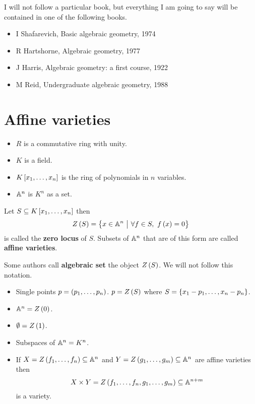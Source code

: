 I will not follow a particular book, but everything I am going to say will be contained in one of the following books.
\begin{itemize}
\item I Shafarevich, Basic algebraic geometry, 1974
\item R Hartshorne, Algebraic geometry, 1977
\item J Harris, Algebraic geometry: a first course, 1922
\item M Reid, Undergraduate algebraic geometry, 1988
\end{itemize}

\pagebreak

\section{Affine varieties}

\begin{notation}
\hfill
\begin{itemize}
\item $ R $ is a commutative ring with unity.
\item $ K $ is a field.
\item $ K\sbr{x_1, \dots, x_n} $ is the ring of polynomials in $ n $ variables.
\item $ \AA^n $ is $ K^n $ as a set.
\end{itemize}
\end{notation}

\begin{definition}
Let $ S \subseteq K\sbr{x_1, \dots, x_n} $ then
$$ Z\br{S} = \cbr{x \in \AA^n \st \forall f \in S, \ f\br{x} = 0} $$
is called the \textbf{zero locus} of $ S $. Subsets of $ \AA^n $ that are of this form are called \textbf{affine varieties}.
\end{definition}

\begin{remark}
Some authors call \textbf{algebraic set} the object $ Z\br{S} $. We will not follow this notation.
\end{remark}

\begin{example}
\hfill
\begin{itemize}
\item Single points $ p = \br{p_1, \dots, p_n} $. $ p = Z\br{S} $ where $ S = \cbr{x_1 - p_1, \dots, x_n - p_n} $.
\item $ \AA^n = Z\br{0} $.
\item $ \emptyset = Z\br{1} $.
\item Subspaces of $ \AA^n = K^n $.
\item If $ X = Z\br{f_1, \dots, f_n} \subseteq \AA^n $ and $ Y = Z\br{g_1, \dots, g_m} \subseteq \AA^n $ are affine varieties then
$$ X \times Y = Z\br{f_1, \dots, f_n, g_1, \dots, g_m} \subseteq \AA^{n + m} $$
is a variety.
\end{itemize}
\end{example}

